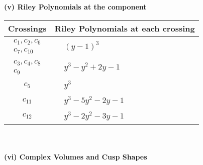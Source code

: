 \documentclass[1p]{elsarticle_modified}
\theoremstyle{definition}
\begin{document}
\newpage\renewcommand{\arraystretch}{1}
\flushleft \textbf{(v) Riley Polynomials at the component}\newline \\
\begin{tabular}{m{50pt}|m{274pt}}
Crossings & \hspace{64pt}Riley Polynomials at each crossing \\
\hline $$\begin{aligned}c_{1},c_{2},c_{6}\\c_{7},c_{10}\end{aligned}$$&$\begin{aligned}
&(y-1)^3
\end{aligned}$\\
\hline $$\begin{aligned}c_{3},c_{4},c_{8}\\c_{9}\end{aligned}$$&$\begin{aligned}
&y^3- y^2+2 y-1
\end{aligned}$\\
\hline $$\begin{aligned}c_{5}\end{aligned}$$&$\begin{aligned}
&y^3
\end{aligned}$\\
\hline $$\begin{aligned}c_{11}\end{aligned}$$&$\begin{aligned}
&y^3-5 y^2-2 y-1
\end{aligned}$\\
\hline $$\begin{aligned}c_{12}\end{aligned}$$&$\begin{aligned}
&y^3-2 y^2-3 y-1
\end{aligned}$\\
\hline
\end{tabular}\\~\\
\newpage\flushleft \textbf{(vi) Complex Volumes and Cusp Shapes}
\end{document}
